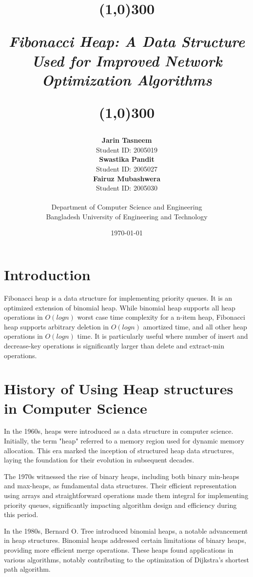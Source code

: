\documentclass[12pt, a4paper]{article}
\title{
	\line(1,0){300}
	\endgraf\bigskip
	\Huge
	\begin{center}
		\emph{\Large{\textbf{Fibonacci Heap: A Data Structure Used for Improved Network Optimization Algorithms}}}
		
	\end{center}
	\line(1,0){300}
	\bigskip
	\bigskip
}
\author{
	\textbf{Jarin Tasneem}\\Student ID: 2005019\\
	\textbf{Swastika Pandit}\\Student ID: 2005027\\
	\textbf{Fairuz Mubashwera}\\Student ID: 2005030\\\\
	Department of Computer Science and Engineering\\
	Bangladesh University of Engineering and Technology\\
}
\date{
	\endgraf\bigskip
	{\today}
}
\begin{document}
	\maketitle
	\pagebreak
	
	\tableofcontents
	\setcounter{tocdepth}{2}
	\newpage
	
	\listoffigures
	\newpage
	
	
	
	\section{Introduction}
	Fibonacci heap is a data structure for implementing priority queues. It is an optimized extension of binomial heap. While binomial heap supports all heap operations in $O(log n)$ worst case time complexity for a n-item heap, Fibonacci heap supports arbitrary deletion in $O(log n)$ amortized time, and all other heap operations in $O(log n)$ time. It is particularly useful where number of insert and decrease-key operations is significantly larger than delete and extract-min operations.
	
	\section{History of Using Heap structures in Computer Science}
	
	
	In the 1960s, heaps were introduced as a data structure in computer science. Initially, the term "heap" referred to a memory region used for dynamic memory allocation. This era marked the inception of structured heap data structures, laying the foundation for their evolution in subsequent decades.
	
	The 1970s witnessed the rise of binary heaps, including both binary min-heaps and max-heaps, as fundamental data structures. Their efficient representation using arrays and straightforward operations made them integral for implementing priority queues, significantly impacting algorithm design and efficiency during this period.
	
	In the 1980s, Bernard O. Tree introduced binomial heaps, a notable advancement in heap structures. Binomial heaps addressed certain limitations of binary heaps, providing more efficient merge operations. These heaps found applications in various algorithms, notably contributing to the optimization of Dijkstra's shortest path algorithm.
	
\end{document}
